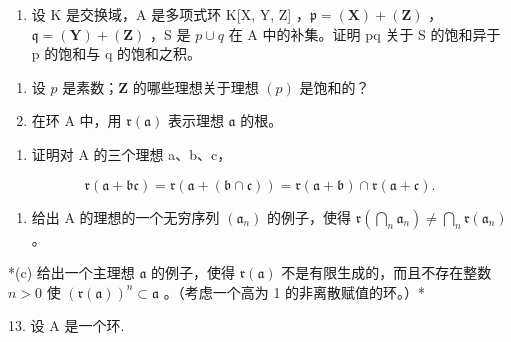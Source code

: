 \begin{enumerate}
\def\labelenumi{(\alph{enumi})}
\setcounter{enumi}{1}
\tightlist
\item
  设 K 是交换域，A 是多项式环 K{[}X, Y, Z{]} ，\(\mathfrak{p} = (\mathbf{X}) + (\mathbf{Z})\) ，\(\mathfrak{q} = (\mathbf{Y}) + (\mathbf{Z})\) ，S 是 \(p \cup q\) 在 A 中的补集。证明 pq 关于 S 的饱和异于 p 的饱和与 q 的饱和之积。
\end{enumerate}

\begin{enumerate}
\def\labelenumi{\arabic{enumi}.}
\setcounter{enumi}{10}
\item
  设 \(p\) 是素数；\(\mathbf{Z}\) 的哪些理想关于理想 \((p)\) 是饱和的？
\item
  在环 A 中，用 \(\mathfrak{r}(\mathfrak{a})\) 表示理想 \(\mathfrak{a}\) 的根。
\end{enumerate}

\begin{enumerate}
\def\labelenumi{(\alph{enumi})}
\tightlist
\item
  证明对 A 的三个理想 a、b、c，
\end{enumerate}

\[
\mathfrak {r} (\mathfrak {a} + \mathfrak {b c}) = \mathfrak {r} (\mathfrak {a} + (\mathfrak {b} \cap \mathfrak {c})) = \mathfrak {r} (\mathfrak {a} + \mathfrak {b}) \cap \mathfrak {r} (\mathfrak {a} + \mathfrak {c}).
\]

\begin{enumerate}
\def\labelenumi{(\alph{enumi})}
\setcounter{enumi}{1}
\tightlist
\item
  给出 A 的理想的一个无穷序列 \((\mathfrak{a}_n)\) 的例子，使得 \(\mathfrak{r}\left(\bigcap_{n} \mathfrak{a}_n\right) \neq \bigcap_{n} \mathfrak{r}(\mathfrak{a}_n)\) 。
\end{enumerate}

*(c) 给出一个主理想 \(\mathfrak{a}\) 的例子，使得 \(\mathfrak{r}(\mathfrak{a})\) 不是有限生成的，而且不存在整数 \(n > 0\) 使 \((\mathfrak{r}(\mathfrak{a}))^n \subset \mathfrak{a}\) 。（考虑一个高为 1 的非离散赋值的环。）*

13. 设 A 是一个环.\par

